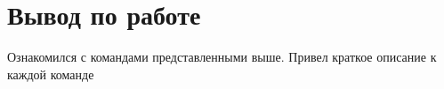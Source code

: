 \documentclass[a4paper,14pt]{extarticle}
\begin{document}
\section{Вывод по работе}
Ознакомился с командами представленными выше. Привел краткое описание к каждой команде


% 
% 
% 
% 
% 
% 
%
%
%  
%  
%  
\end{document}
